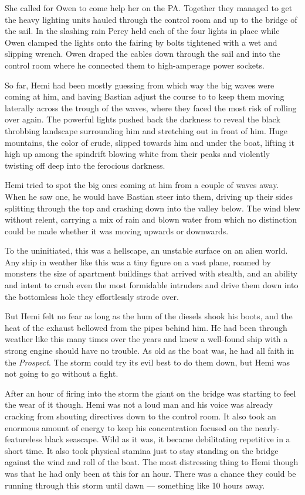 \documentclass[
]{scrbook}
\begin{document}
She called for Owen to come help her on the PA. Together they managed to
get the heavy lighting units hauled through the control room and up to
the bridge of the sail. In the slashing rain Percy held each of the four
lights in place while Owen clamped the lights onto the fairing by bolts
tightened with a wet and slipping wrench. Owen draped the cables down
through the sail and into the control room where he connected them to
high-amperage power sockets.

So far, Hemi had been mostly guessing from which way the big waves were
coming at him, and having Bastian adjust the course to to keep them
moving laterally across the trough of the waves, where they faced the
most risk of rolling over again. The powerful lights pushed back the
darkness to reveal the black throbbing landscape surrounding him and
stretching out in front of him. Huge mountains, the color of crude,
slipped towards him and under the boat, lifting it high up among the
spindrift blowing white from their peaks and violently twisting off deep
into the ferocious darkness.

Hemi tried to spot the big ones coming at him from a couple of waves
away. When he saw one, he would have Bastian steer into them, driving up
their sides splitting through the top and crashing down into the valley
below. The wind blew without relent, carrying a mix of rain and blown
water from which no distinction could be made whether it was moving
upwards or downwards.

To the uninitiated, this was a hellscape, an unstable surface on an
alien world. Any ship in weather like this was a tiny figure on a vast
plane, roamed by monsters the size of apartment buildings that arrived
with stealth, and an ability and intent to crush even the most
formidable intruders and drive them down into the bottomless hole they
effortlessly strode over.

But Hemi felt no fear as long as the hum of the diesels shook his boots,
and the heat of the exhaust bellowed from the pipes behind him. He had
been through weather like this many times over the years and knew a
well-found ship with a strong engine should have no trouble. As old as
the boat was, he had all faith in the \emph{Prospect}. The storm could
try its evil best to do them down, but Hemi was not going to go without
a fight.

After an hour of firing into the storm the giant on the bridge was
starting to feel the wear of it though. Hemi was not a loud man and his
voice was already cracking from shouting directives down to the control
room. It also took an enormous amount of energy to keep his
concentration focused on the nearly-featureless black seascape. Wild as
it was, it became debilitating repetitive in a short time. It also took
physical stamina just to stay standing on the bridge against the wind
and roll of the boat. The most distressing thing to Hemi though was that
he had only been at this for an hour. There was a chance they could be
running through this storm until dawn --- something like 10 hours away.
\end{document}
